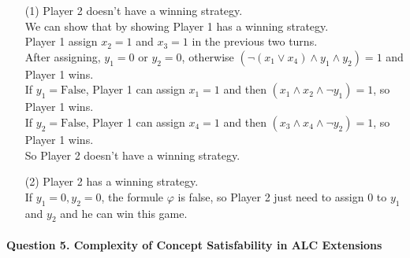 \documentclass[12pt]{article}
\begin{document}
    \begin{enumerate}
        \item [(1)]
        Player 2 doesn't have a winning strategy. \\
        We can show that by showing Player 1 has a winning strategy.\\
        Player 1 assign $x_2 = 1$ and $x_3 = 1$ in the previous two turns.\\
        After assigning, $y_1 = 0$ or $y_2 = 0$, otherwise $(\lnot (x_1 \lor x_4) \land y_1 \land y_2) = 1$ and Player 1 wins.\\
        If $y_1 = \text{False}$, Player 1 can assign $x_1 = 1$ and then $(x_1 \land x_2 \land \lnot y_1) = 1$, so Player 1 wins.\\
        If $y_2 = \text{False}$, Player 1 can assign $x_4 = 1$ and then $(x_3 \land x_4 \land \lnot y_2) = 1$, so Player 1 wins. \\
        So Player 2 doesn't have a winning strategy.
        \item [(2)]
        Player 2 has a winning strategy. \\
        If $y_1 = 0, y_2 = 0$, the formule $\varphi$ is false, so Player 2 just need to assign 0 to $y_1$ and $y_2$ and he can win this game.
    \end{enumerate}

    \newpage
    \paragraph{Question 5. Complexity of Concept Satisfability in ALC Extensions}~{}
    \\
\end{document}
